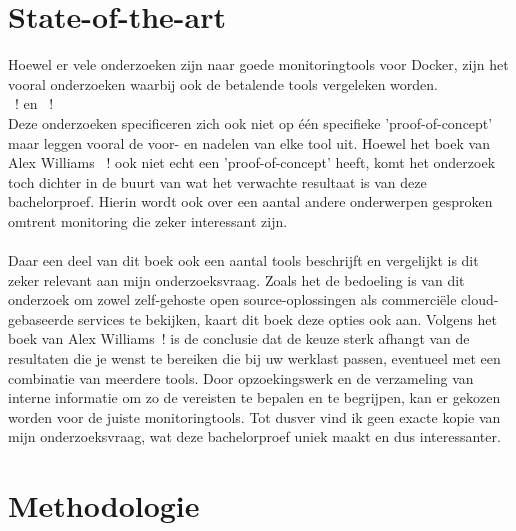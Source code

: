 
\section{State-of-the-art}
\label{sec:state-of-the-art}

Hoewel er vele onderzoeken zijn naar goede monitoringtools voor Docker, zijn het vooral onderzoeken waarbij ook de betalende tools vergeleken worden. \\~\autocite{Ribenzaft2020}! en ~\autocite{Cirelly2020}!\\ Deze onderzoeken specificeren zich ook niet op één specifieke 'proof-of-concept' maar leggen vooral de voor- en nadelen van elke tool uit.
Hoewel het boek van Alex Williams ~\autocite{2015}! ook niet echt een 'proof-of-concept' heeft, komt het onderzoek toch dichter in de buurt van wat het verwachte resultaat is van deze bachelorproef. Hierin wordt ook over een aantal andere onderwerpen gesproken omtrent monitoring die zeker interessant zijn. 
\\
\\
Daar een deel van dit boek ook een aantal tools beschrijft en vergelijkt is dit zeker relevant aan mijn onderzoeksvraag. Zoals het de bedoeling is van dit onderzoek om zowel zelf-gehoste open source-oplossingen als commerciële cloud-gebaseerde services te bekijken, kaart dit boek deze opties ook aan. Volgens het boek van Alex Williams~\autocite{2015}! is de conclusie dat de keuze sterk afhangt van de resultaten die je wenst te bereiken die bij uw werklast passen, eventueel met een combinatie van meerdere tools. Door opzoekingswerk en de verzameling van interne informatie om zo de vereisten te bepalen en te begrijpen, kan er gekozen worden voor de juiste monitoringtools. Tot dusver vind ik geen exacte kopie van mijn onderzoeksvraag, wat deze bachelorproef uniek maakt en dus interessanter.


\section{Methodologie}
\label{sec:methodologie}

